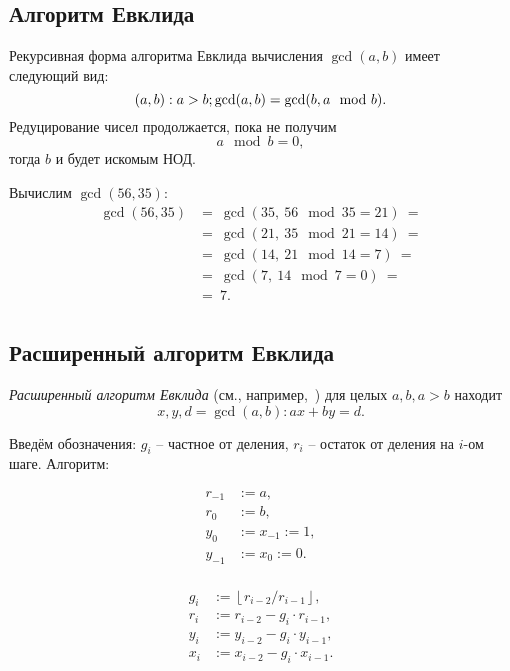 \subsection{Алгоритм Евклида}

Рекурсивная форма алгоритма Евклида вычисления $\gcd(a,b)$ имеет следующий вид:
    \[\mathbb{(}a,b): a>b;  \gcd(a,b) = \gcd(b, a \mod b). \]
Редуцирование чисел продолжается, пока не получим
    \[ a \mod b = 0, \]
тогда $b$ и будет искомым НОД.

\example
Вычислим $\gcd(56, 35)$:
\[ \begin{array}{ll}
    \gcd(56, 35) & =~ \gcd(35, ~ 56 \mod 35 = 21) ~= \\
    & =~ \gcd(21, ~ 35 \mod 21 = 14) ~= \\
    & =~ \gcd(14, ~ 21 \mod 14 = 7) ~= \\
    & =~ \gcd(7, ~ 14 \mod 7 = 0) ~= \\
    & =~ 7. \\
\end{array} \]
\exampleend


\subsection{Расширенный алгоритм Евклида}

\emph{Расширенный алгоритм Евклида} (см., например,~\cite[8.8 Наибольшие общие делители и алгоритм Евклида]{Aho:1979}) для целых $a, b, a > b$ находит
    \[ x, y, d = \gcd(a,b): ax + by = d. \]

Введём обозначения: $g_i$ -- частное от деления, $r_i$ -- остаток от деления на $i$-ом шаге. Алгоритм:

\[\begin{array}{ll}
	r_{-1} & := a, \\
	r_0 & := b, \\
	y_0 & := x_{-1} := 1, \\
	y_{-1} & := x_0 := 0. \\
\end{array}\]

\[\begin{array}{ll}
	g_i & := \left\lfloor r_{i-2} / r_{i-1} \right\rfloor, \\
	r_i & := r_{i-2} - g_i \cdot r_{i-1}, \\
	y_i & := y_{i-2} - g_i \cdot y_{i-1} , \\
	x_i & := x_{i-2} - g_i \cdot x_{i-1} . \\
\end{array}\]

